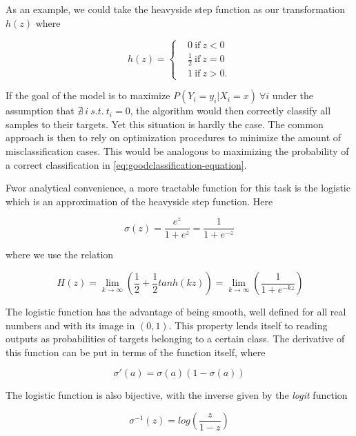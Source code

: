 As an example, we could take the heavyside step function as our transformation $h(z)$  where

\begin{equation}
h(z) =
\begin{cases}
&0 \ \mbox{if} \ z<0 \\
&\frac{1}{2} \ \mbox{if} \  z=0 \\
&1 \ \mbox{if} \  z>0.
\end{cases}
\end{equation}

If the goal of the model is to maximize $P(Y_i = y_i | X_i = x) \ \forall i$
under the assumption that $\nexists\  i \  s.t. \ t_i = 0$, the algorithm would then correctly classify all samples to their targets. Yet this situation is hardly the case. The common approach is then to rely on optimization procedures to minimize the amount of misclassification cases. This would be analogous to maximizing the probability of a correct classification in  \ref{eq:goodclassification-equation}.

Fwor analytical convenience, a more tractable function for this task is the logistic which is an approximation of the heavyside step function. Here

\begin{equation} \label{eq:logisticFunction}
\sigma(z)  = \frac{e^{z}}{1 + e^{z}} = \frac{1}{1 + e^{-z}}
\end{equation}

where  we use the relation

\begin{equation}
 \  H(z) = \lim_{k \to \infty} \left(\frac{1}{2} + \frac{1}{2}tanh(kz) \right) = \lim_{k \to \infty} \left(\frac{1}{1+e^{-kz}} \right)
\end{equation}

The logistic function has the advantage of being smooth, well defined for all real numbers and with its image in $(0,1)$. This property lends itself to reading outputs as probabilities of targets belonging to a certain class. The derivative of this function can be put in terms of the function itself, where

\begin{equation} \label{eq:derivativeLogisticFunction}
\sigma '(a) = \sigma(a)( 1 - \sigma(a) )
\end{equation}

The logistic function is also bijective, with the inverse given by the \textit{logit} function

\begin{equation} \label{eq:logitFunction}
\sigma^{-1}(z)  = log( \frac{z}{1 - z})
\end{equation}

